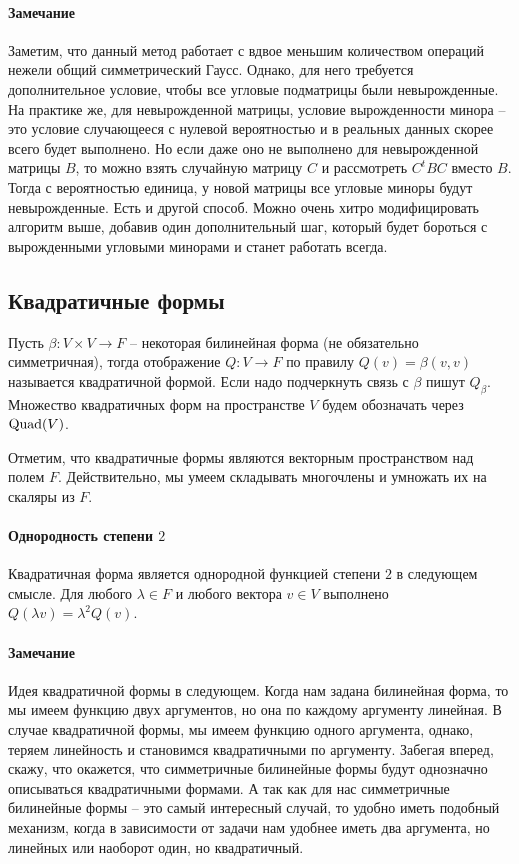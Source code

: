 \paragraph{Замечание}
Заметим, что данный метод работает с вдвое меньшим количеством операций нежели общий симметрический Гаусс. Однако, для него требуется дополнительное условие, чтобы все  угловые подматрицы были невырожденные. На практике же, для невырожденной матрицы, условие вырожденности минора -- это условие случающееся с нулевой вероятностью и в реальных данных скорее всего будет выполнено. Но если даже оно не выполнено для невырожденной матрицы $B$, то можно взять случайную матрицу $C$ и рассмотреть $C^tBC$ вместо $B$. Тогда с вероятностью единица, у новой матрицы все угловые миноры будут невырожденные. Есть и другой способ. Можно очень хитро модифицировать алгоритм выше, добавив один дополнительный шаг, который будет бороться с вырожденными угловыми минорами и станет работать всегда.


\subsection{Квадратичные формы}


\begin{definition}
Пусть $\beta\colon V\times V\to F$ -- некоторая билинейная форма (не обязательно симметричная), тогда отображение $Q\colon V\to F$ по правилу $Q(v) = \beta(v, v)$ называется квадратичной формой. Если надо подчеркнуть связь с $\beta$ пишут $Q_\beta$.  Множество квадратичных форм на пространстве $V$ будем обозначать через $\operatorname{Quad}(V)$.
\end{definition}

Отметим, что квадратичные формы являются векторным пространством над полем $F$. Действительно, мы умеем складывать многочлены и умножать их на скаляры из $F$.

\paragraph{Однородность степени $2$}
Квадратичная форма является однородной функцией степени $2$ в следующем смысле. Для любого $\lambda\in F$ и любого вектора $v\in V$ выполнено $Q(\lambda v) = \lambda^2 Q(v)$.


\paragraph{Замечание}
Идея квадратичной формы в следующем. Когда нам задана билинейная форма, то мы имеем функцию двух аргументов, но она по каждому аргументу линейная. В случае квадратичной формы, мы имеем функцию одного аргумента, однако, теряем линейность и становимся квадратичными по аргументу. Забегая вперед, скажу, что окажется, что симметричные билинейные формы будут однозначно описываться квадратичными формами. А так как для нас симметричные билинейные формы -- это самый интересный случай, то удобно иметь подобный механизм, когда в зависимости от задачи нам удобнее иметь два аргумента, но линейных или наоборот один, но квадратичный.


